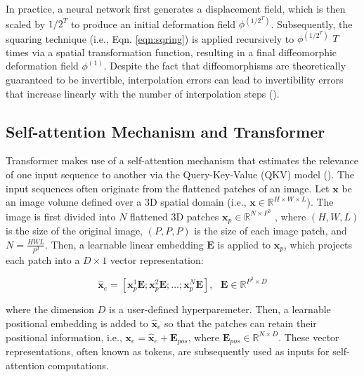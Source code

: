 \documentclass[times,twocolumn,final]{elsarticle}
\begin{document}
In practice, a neural network first generates a displacement field, which is then scaled by $1/2^T$ to produce an initial deformation field $\phi^{(1/2^T)}$. Subsequently, the squaring technique (i.e., Eqn. \ref{eqn:sqring}) is applied recursively to $\phi^{(1/2^T)}$ $T$ times via a spatial transformation function, resulting in a final diffeomorphic deformation field $\phi^{(1)}$. Despite the fact that diffeomorphisms are theoretically guaranteed to be invertible, interpolation errors can lead to invertibility errors that increase linearly with the number of interpolation steps (\cite{avants2008symmetric, mok2020fast}).

\subsection{Self-attention Mechanism and Transformer}
Transformer makes use of a self-attention mechanism that estimates the relevance of one input sequence to another via the Query-Key-Value (QKV) model (\cite{vaswani2017attention, dosovitskiy2020image}). The input sequences often originate from the flattened patches of an image. Let $\mathbf{x}$ be an image volume defined over a 3D spatial domain (i.e., $\mathbf{x} \in \mathbb{R}^{H\times W\times L}$). The image is first divided into $N$ flattened 3D patches $\mathbf{x}_p\in\mathbb{R}^{N\times P^3}$ , where $(H, W, L)$ is the size of the original image, $(P,P,P)$ is the size of each image patch, and $N=\frac{HWL}{P^3}$. Then, a learnable linear embedding $\mathbf{E}$ is applied to $\mathbf{x}_p$, which projects each patch into a $D\times1$ vector representation:
\begin{linenomath}
\begin{equation}
    \hat{\mathbf{x}}_e=[\mathbf{x}^1_p\mathbf{E};\mathbf{x}^2_p\mathbf{E};...;\mathbf{x}^N_p\mathbf{E}],\ \ \ \mathbf{E}\in\mathbb{R}^{P^3\times D}
\end{equation}
\end{linenomath}
where the dimension $D$ is a user-defined hyperparemeter. Then, a learnable positional embedding is added to $\hat{\mathbf{x}}_e$ so that the patches can retain their positional information, i.e., $\mathbf{x}_e=\hat{\mathbf{x}}_e+\mathbf{E}_{pos}$, where $\mathbf{E}_{pos}\in\mathbb{R}^{N\times D}$. These vector representations, often known as tokens, are subsequently used as inputs for self-attention computations.
\end{document}
